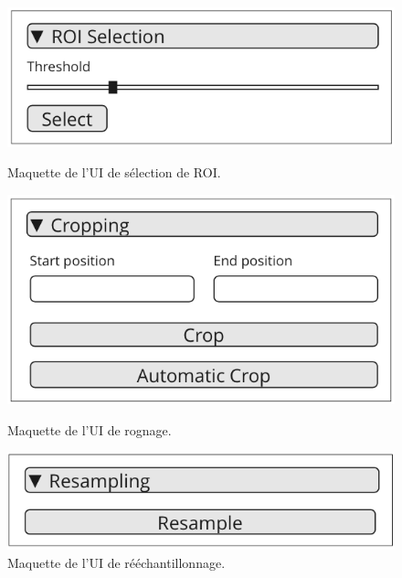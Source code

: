 \documentclass{article}
\begin{document}
{{        \begin{figure}[!ht]
            \centering
            \begin{minipage}[t]{0.3\textwidth}
                \centering
                \includegraphics[width=\textwidth]{images/roi-ui-mock-up.png}
                \caption{Maquette de l'UI de sélection de ROI.}
                \label{fig:roi-ui-mock-up}
            \end{minipage}
            \hfill
            \begin{minipage}[t]{0.3\textwidth}
                \centering
                \includegraphics[width=\textwidth]{images/cropping-ui-mock-up.png}
                \caption{Maquette de l'UI de rognage.}
                \label{fig:cropping-ui-mock-up}
            \end{minipage}
            \hfill
            \begin{minipage}[t]{0.3\textwidth}
                \centering
                \includegraphics[width=\textwidth]{images/resampling-ui-mock-up.png}
                \caption{Maquette de l'UI de rééchantillonnage.}
                \label{fig:resampling-ui-mock-up}
            \end{minipage}
        \end{figure}

}}
\end{document}
